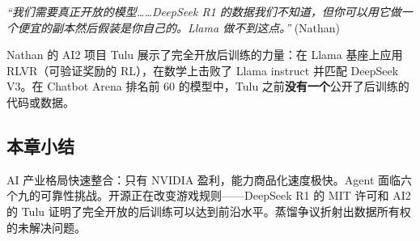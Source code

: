 \textit{``我们需要真正开放的模型……DeepSeek R1 的数据我们不知道，但你可以用它做一个便宜的副本然后假装是你自己的。Llama 做不到这点。''} (Nathan)

Nathan 的 AI2 项目 Tulu 展示了完全开放后训练的力量：在 Llama 基座上应用 RLVR（可验证奖励的 RL），在数学上击败了 Llama instruct 并匹配 DeepSeek V3。在 Chatbot Arena 排名前 60 的模型中，Tulu 之前\textbf{没有一个}公开了后训练的代码或数据。

\subsection{本章小结}

AI 产业格局快速整合：只有 NVIDIA 盈利，能力商品化速度极快。Agent 面临六个九的可靠性挑战。开源正在改变游戏规则——DeepSeek R1 的 MIT 许可和 AI2 的 Tulu 证明了完全开放的后训练可以达到前沿水平。蒸馏争议折射出数据所有权的未解决问题。


